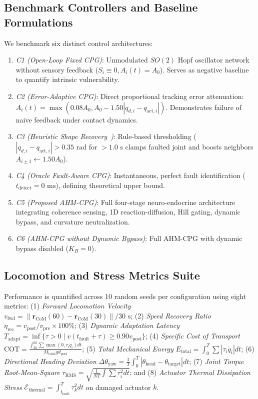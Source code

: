 \documentclass{iopjournal}
\begin{document}
\subsection{Benchmark Controllers and Baseline Formulations}
We benchmark six distinct control architectures:
\begin{enumerate}
\item \textit{C1 (Open-Loop Fixed CPG)}: Unmodulated $SO(2)$ Hopf oscillator network without sensory feedback ($S_i \equiv 0, A_i(t) = A_0$). Serves as negative baseline to quantify intrinsic vulnerability.
\item \textit{C2 (Error-Adaptive CPG)}: Direct proportional tracking error attenuation: $A_i(t) = \max(0.08 A_0, A_0 - 1.50 |q_{d,i} - q_{\text{act},i}|)$. Demonstrates failure of naive feedback under contact dynamics.
\item \textit{C3 (Heuristic Shape Recovery~\cite{elsayed2021})}: Rule-based thresholding ($|q_{d,i} - q_{\text{act},i}| > 0.35\text{ rad}$ for $>1.0\text{ s}$ clamps faulted joint and boosts neighbors $A_{i\pm 1} \leftarrow 1.50 A_0$).
\item \textit{C4 (Oracle Fault-Aware CPG)}: Instantaneous, perfect fault identification ($t_{\text{detect}} = 0\text{ ms}$), defining theoretical upper bound.
\item \textit{C5 (Proposed AHM-CPG)}: Full four-stage neuro-endocrine architecture integrating coherence sensing, 1D reaction-diffusion, Hill gating, dynamic bypass, and curvature neutralization.
\item \textit{C6 (AHM-CPG without Dynamic Bypass)}: Full AHM-CPG with dynamic bypass disabled ($K_B = 0$).
\end{enumerate}

\subsection{Locomotion and Stress Metrics Suite}
Performance is quantified across 10 random seeds per configuration using eight metrics: (1) \textit{Forward Locomotion Velocity} $v_{\text{fwd}} = \|\mathbf{r}_{\text{CoM}}(60) - \mathbf{r}_{\text{CoM}}(30)\| / 30\text{ s}$; (2) \textit{Speed Recovery Ratio} $\eta_{\text{rec}} = v_{\text{post}} / v_{\text{pre}} \times 100\%$; (3) \textit{Dynamic Adaptation Latency} $T_{\text{adapt}} = \inf \{ \tau > 0 \mid v(t_{\text{fault}} + \tau) \ge 0.90 v_{\text{post}} \}$; (4) \textit{Specific Cost of Transport} $\text{COT} = \frac{\int_{30}^{60} \sum \max(0, \tau_i \dot{q}_i) dt}{M_{\text{total}} g d_{\text{post}}}$; (5) \textit{Total Mechanical Energy} $E_{\text{total}} = \int_0^T \sum |\tau_i \dot{q}_i| dt$; (6) \textit{Directional Heading Deviation} $\Delta\theta_{\text{yaw}} = \frac{1}{T} \int_0^T |\theta_{\text{head}} - \theta_{\text{target}}| dt$; (7) \textit{Joint Torque Root-Mean-Square} $\tau_{\text{RMS}} = \sqrt{\frac{1}{NT} \int \sum \tau_i^2 dt}$; and (8) \textit{Actuator Thermal Dissipation Stress} $\mathcal{E}_{\text{thermal}} = \int_{t_{\text{fault}}}^T \tau_k^2 dt$ on damaged actuator $k$.
\end{document}
